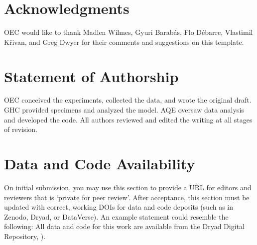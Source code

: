 \documentclass[11pt]{article}
\begin{document}


\section*{Acknowledgments}

OEC would like to thank Madlen Wilmes, Gyuri Barab\'{a}s, Flo D\'{e}barre, Vlastimil K\v{r}ivan, and Greg Dwyer for their comments and suggestions on this template.


\section*{Statement of Authorship}

OEC conceived the experiments, collected the data, and wrote the original draft.
GHC provided specimens and analyzed the model.
AQE oversaw data analysis and developed the code. 
All authors reviewed and edited the writing at all stages of revision.

\section*{Data and Code Availability}

On initial submission, you may use this section to provide a URL for editors and reviewers that is `private for peer review'. After acceptance, this section must be updated with correct, working DOIs for data and code deposits (such as in Zenodo, Dryad, or DataVerse). An example statement could resemble the following: All data and code for this work are available from the Dryad Digital Repository, \citealt{CookEtAl2015}). 
\end{document}
